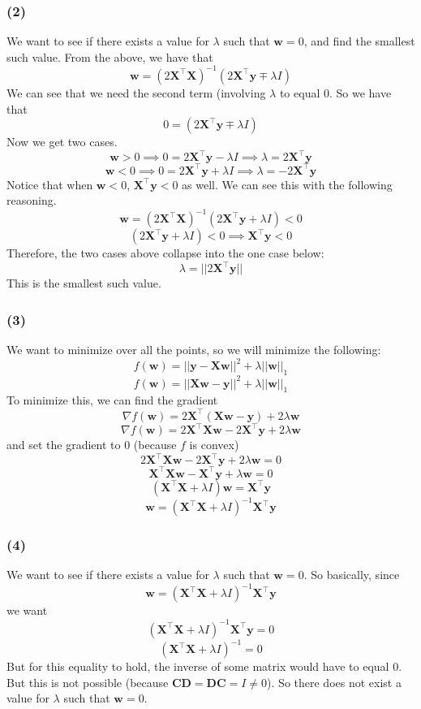 \documentclass{article}
\newcommand*{\wb}{\ensuremath{\mathbf{w}}}
\newcommand*{\yb}{\ensuremath{\mathbf{y}}}
\newcommand*{\Xb}{\ensuremath{\mathbf{X}}}
\begin{document}
\subsubsection*{(2)}
We want to see if there exists a value for $\lambda$ such that
$\wb = 0$, and find the smallest such value.
From the above, we have that
\[ \wb = (2 \Xb^{\intercal} \Xb)^{-1} (2 \Xb^{\intercal}\yb \mp \lambda I) \]
We can see that we need the second term (involving $\lambda$ to equal $0$.
So we have that
\[ 0 = (2 \Xb^{\intercal}\yb \mp \lambda I) \]
Now we get two cases.
\[ \wb > 0 \implies 0 = 2 \Xb^{\intercal}\yb - \lambda I \implies
    \lambda = 2 \Xb^{\intercal}\yb \]
\[ \wb < 0 \implies 0 = 2 \Xb^{\intercal}\yb + \lambda I \implies
    \lambda = -2 \Xb^{\intercal}\yb \]
Notice that when $\wb < 0$, $\Xb^{\intercal} \yb < 0$ as well. We can see this
with the following reasoning.
\[ \wb = (2 \Xb^{\intercal} \Xb)^{-1} (2 \Xb^{\intercal}\yb + \lambda I) < 0 \]
\[ (2 \Xb^{\intercal}\yb + \lambda I) < 0 \implies \Xb^{\intercal} \yb < 0 \]
Therefore, the two cases above collapse into the one case below:
\[ \lambda = ||2 \Xb^{\intercal} \yb|| \]
This is the smallest such value.

\subsubsection*{(3)}
We want to minimize over all the points, so we will minimize the following:
\[ f(\wb) = ||\yb - \Xb \wb||^2 + \lambda||\wb||_1 \]
\[ f(\wb) = ||\Xb \wb - \yb||^2 + \lambda||\wb||_1 \]
To minimize this, we can find the gradient
\[ \nabla f(\wb) = 2 \Xb^{\intercal} (\Xb \wb - \yb) + 2 \lambda \wb \]
\[ \nabla f(\wb) = 2 \Xb^{\intercal} \Xb \wb - 2 \Xb^{\intercal} \yb
    + 2 \lambda \wb \]
and set the gradient to $0$ (because $f$ is convex)
\[ 2 \Xb^{\intercal} \Xb \wb - 2 \Xb^{\intercal} \yb
    + 2 \lambda \wb = 0 \]
\[ \Xb^{\intercal} \Xb \wb - \Xb^{\intercal} \yb + \lambda \wb = 0 \]
\[ (\Xb^{\intercal} \Xb + \lambda I) \wb = \Xb^{\intercal} \yb \]
\[ \wb = (\Xb^{\intercal} \Xb + \lambda I)^{-1} \Xb^{\intercal} \yb \]

\subsubsection*{(4)}
We want to see if there exists a value for $\lambda$ such that $\wb = 0$.
So basically, since
\[ \wb = (\Xb^{\intercal} \Xb + \lambda I)^{-1} \Xb^{\intercal} \yb \]
we want
\[ (\Xb^{\intercal} \Xb + \lambda I)^{-1} \Xb^{\intercal} \yb = 0 \]
\[ (\Xb^{\intercal} \Xb + \lambda I)^{-1} = 0 \]
But for this equality to hold, the inverse of some matrix would have to equal
0. But this is not possible (because $\mathbf{C}\mathbf{D} = \mathbf{D}\mathbf{C}
= I \neq 0$). So there does not exist a value for $\lambda$
such that $\wb = 0$.
\end{document}
